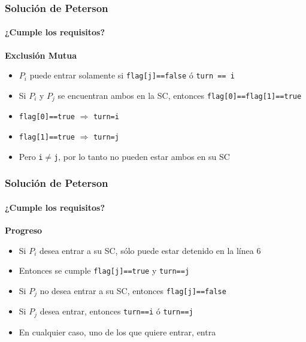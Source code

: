 \documentclass[letter]{beamer}
\begin{document}
\begin{frame}
  \frametitle{Solución de Peterson}
  \framesubtitle{¿Cumple los requisitos?}
  
  {\bf Exclusión Mutua}
  
  \begin{itemize}
    \item $P_i$ puede entrar solamente si {\tt flag[j]==false} ó {\tt turn == i}
    \item Si $P_i$ y $P_j$ se encuentran ambos en la SC, entonces {\tt flag[0]==flag[1]==true}
    \item {\tt flag[0]==true} $\Rightarrow$ {\tt turn=i}
    \item {\tt flag[1]==true} $\Rightarrow$ {\tt turn=j}
    \item Pero {\tt i}$\neq${\tt j}, por lo tanto no pueden estar ambos en su SC
  \end{itemize}
  
\end{frame}

\begin{frame}
  \frametitle{Solución de Peterson}
  \framesubtitle{¿Cumple los requisitos?}

  {\bf Progreso}
  
  \begin{itemize}
    \item Si $P_i$ desea entrar a su SC, sólo puede estar detenido en la línea 6
    \item Entonces se cumple {\tt flag[j]==true} y {\tt turn==j}
    \item Si $P_j$ no desea entrar a su SC, entonces {\tt flag[j]==false}
    \item Si $P_j$ desea entrar, entonces {\tt turn==i} ó {\tt turn==j}
    \item En cualquier caso, uno de los que quiere entrar, entra 
  \end{itemize}

\end{frame}
\end{document}
